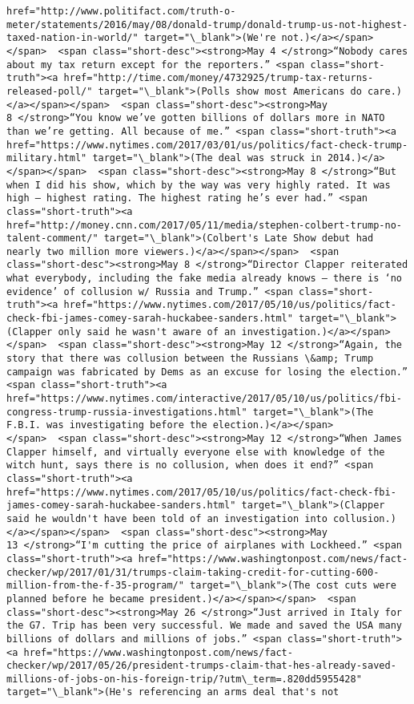 \documentclass[11pt]{article}
\begin{document}
\begin{Verbatim}[commandchars=\\\{\}]
href="http://www.politifact.com/truth-o-meter/statements/2016/may/08/donald-trump/donald-trump-us-not-highest-taxed-nation-in-world/" target="\_blank">(We're not.)</a></span></span>  <span class="short-desc"><strong>May 4 </strong>“Nobody cares about my tax return except for the reporters.” <span class="short-truth"><a href="http://time.com/money/4732925/trump-tax-returns-released-poll/" target="\_blank">(Polls show most Americans do care.)</a></span></span>  <span class="short-desc"><strong>May 8 </strong>“You know we’ve gotten billions of dollars more in NATO than we’re getting. All because of me.” <span class="short-truth"><a href="https://www.nytimes.com/2017/03/01/us/politics/fact-check-trump-military.html" target="\_blank">(The deal was struck in 2014.)</a></span></span>  <span class="short-desc"><strong>May 8 </strong>“But when I did his show, which by the way was very highly rated. It was high — highest rating. The highest rating he’s ever had.” <span class="short-truth"><a href="http://money.cnn.com/2017/05/11/media/stephen-colbert-trump-no-talent-comment/" target="\_blank">(Colbert's Late Show debut had nearly two million more viewers.)</a></span></span>  <span class="short-desc"><strong>May 8 </strong>“Director Clapper reiterated what everybody, including the fake media already knows — there is ‘no evidence’ of collusion w/ Russia and Trump.” <span class="short-truth"><a href="https://www.nytimes.com/2017/05/10/us/politics/fact-check-fbi-james-comey-sarah-huckabee-sanders.html" target="\_blank">(Clapper only said he wasn't aware of an investigation.)</a></span></span>  <span class="short-desc"><strong>May 12 </strong>“Again, the story that there was collusion between the Russians \&amp; Trump campaign was fabricated by Dems as an excuse for losing the election.” <span class="short-truth"><a href="https://www.nytimes.com/interactive/2017/05/10/us/politics/fbi-congress-trump-russia-investigations.html" target="\_blank">(The F.B.I. was investigating before the election.)</a></span></span>  <span class="short-desc"><strong>May 12 </strong>“When James Clapper himself, and virtually everyone else with knowledge of the witch hunt, says there is no collusion, when does it end?” <span class="short-truth"><a href="https://www.nytimes.com/2017/05/10/us/politics/fact-check-fbi-james-comey-sarah-huckabee-sanders.html" target="\_blank">(Clapper said he wouldn't have been told of an investigation into collusion.)</a></span></span>  <span class="short-desc"><strong>May 13 </strong>“I'm cutting the price of airplanes with Lockheed.” <span class="short-truth"><a href="https://www.washingtonpost.com/news/fact-checker/wp/2017/01/31/trumps-claim-taking-credit-for-cutting-600-million-from-the-f-35-program/" target="\_blank">(The cost cuts were planned before he became president.)</a></span></span>  <span class="short-desc"><strong>May 26 </strong>“Just arrived in Italy for the G7. Trip has been very successful. We made and saved the USA many billions of dollars and millions of jobs.” <span class="short-truth"><a href="https://www.washingtonpost.com/news/fact-checker/wp/2017/05/26/president-trumps-claim-that-hes-already-saved-millions-of-jobs-on-his-foreign-trip/?utm\_term=.820dd5955428" target="\_blank">(He's referencing an arms deal that's not 
\end{Verbatim}
\end{document}
